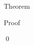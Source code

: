 \documentclass[a4paper]{article}
\begin{document}
\begin{parag}{Theorem}
\begin{subparag}{Proof}



        \qed
    \end{subparag}
\end{parag}
\end{document}
